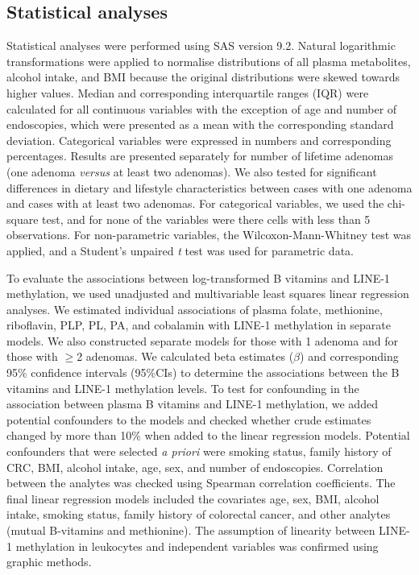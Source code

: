 \subsection{Statistical analyses} %
\noindent Statistical analyses were performed using SAS version 9.2. Natural logarithmic transformations were applied to normalise distributions of all plasma metabolites, alcohol intake, and BMI because the original distributions were skewed towards higher values. Median and corresponding interquartile ranges (IQR) were calculated for all continuous variables with the exception of age and number of endoscopies, which were presented as a mean with the corresponding standard deviation. Categorical variables were expressed in numbers and corresponding percentages. Results are presented separately for number of lifetime adenomas (one adenoma \emph{versus} at least two adenomas). We also tested for significant differences in dietary and lifestyle characteristics between cases with one adenoma and cases with at least two adenomas. For categorical variables, we used the chi-square test, and for none of the variables were there cells with less than 5 observations. For non-parametric variables, the Wilcoxon-Mann-Whitney test was applied, and a Student's unpaired \emph{t} test was used for parametric data.

\noindent To evaluate the associations between log-transformed B vitamins and LINE-1 methylation, we used unadjusted and multivariable least squares linear regression analyses. We estimated individual associations of plasma folate, methionine, riboflavin, PLP, PL, PA, and cobalamin with LINE-1 methylation in separate models. We also constructed separate models for those with 1 adenoma and for those with $\geq$2 adenomas. We calculated beta estimates ($\beta$) and corresponding 95\% confidence intervals (95\%CIs) to determine the associations between the B vitamins and LINE-1 methylation levels. To test for confounding in the association between plasma B vitamins and LINE-1 methylation, we added potential confounders to the models and checked whether crude estimates changed by more than 10\% when added to the linear regression models. Potential confounders that were selected \emph{a priori} were smoking status, family history of CRC, BMI, alcohol intake, age, sex, and number of endoscopies. Correlation between the analytes was checked using Spearman correlation coefficients. The final linear regression models included the covariates age, sex, BMI, alcohol intake, smoking status, family history of colorectal cancer, and other analytes (mutual B-vitamins and methionine). The assumption of linearity between LINE-1 methylation in leukocytes and independent variables was confirmed using graphic methods.


